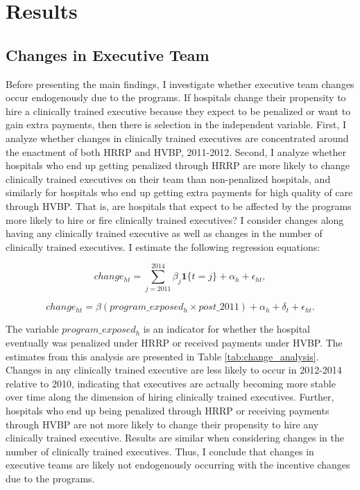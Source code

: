 \documentclass[12pt]{article}
\begin{document}
    \section{Results}

    \subsection{Changes in Executive Team}\label{sec:endog}

    Before presenting the main findings, I investigate whether executive team changes occur endogenously due to the programs. If hospitals change their propensity to hire a clinically trained executive because they expect to be penalized or want to gain extra payments, then there is selection in the independent variable. First, I analyze whether changes in clinically trained executives are concentrated around the enactment of both HRRP and HVBP, 2011-2012. Second, I analyze whether hospitals who end up getting penalized through HRRP are more likely to change clinically trained executives on their team than non-penalized hospitals, and similarly for hospitals who end up getting extra payments for high quality of care through HVBP. That is, are hospitals that expect to be affected by the programs more likely to hire or fire clinically trained executives? I consider changes along having any clinically trained executive as well as changes in the number of clinically trained executives. I estimate the following regression equations:

    \begin{equation}
    change_{ht} = \sum_{j=2011}^{2014}\beta_j\mathbf{1}\{t=j\} + \alpha_h + \epsilon_{ht},
    \end{equation}

    \begin{equation}
    change_{ht} = \beta(program\_exposed_{h} \times post\_2011)+ \alpha_h + \delta_t + \epsilon_{ht}.
    \end{equation}

    The variable $program\_exposed_{h}$ is an indicator for whether the hospital eventually was penalized under HRRP or received payments under HVBP. The estimates from this analysis are presented in Table \ref{tab:change_analysis}. Changes in any clinically trained executive are less likely to occur in 2012-2014 relative to 2010, indicating that executives are actually becoming more stable over time along the dimension of hiring clinically trained executives. Further, hospitals who end up being penalized through HRRP or receiving payments through HVBP are not more likely to change their propensity to hire any clinically trained executive. Results are similar when considering changes in the number of clinically trained executives. Thus, I conclude that changes in executive teams are likely not endogenously occurring with the incentive changes due to the programs. 
\end{document}
